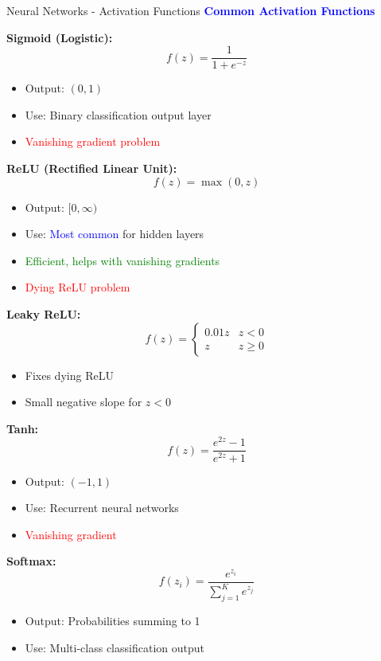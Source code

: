\documentclass[8pt]{beamer}
\begin{document}
	\begin{frame}{Neural Networks - Activation Functions}
		\fontsize{6.5}{7.5}\selectfont
		\textcolor{blue}{\textbf{Common Activation Functions}}
		
		\textbf{Sigmoid (Logistic):}
		\[
		f(z) = \frac{1}{1 + e^{-z}}
		\]
		\begin{itemize}
			\item Output: $(0, 1)$
			\item Use: Binary classification output layer
			\item \textcolor{red}{Vanishing gradient problem}
		\end{itemize}
		
		\textbf{ReLU (Rectified Linear Unit):}
		\[
		f(z) = \max(0, z)
		\]
		\begin{itemize}
			\item Output: $[0, \infty)$
			\item Use: \textcolor{blue}{Most common} for hidden layers
			\item \textcolor{green}{Efficient, helps with vanishing gradients}
			\item \textcolor{red}{Dying ReLU problem}
		\end{itemize}
		
		\textbf{Leaky ReLU:}
		\[
		f(z) = \begin{cases} 0.01z & z < 0 \\ z & z \geq 0 \end{cases}
		\]
		\begin{itemize}
			\item Fixes dying ReLU
			\item Small negative slope for $z < 0$
		\end{itemize}
		
		\textbf{Tanh:}
		\[
		f(z) = \frac{e^{2z} - 1}{e^{2z} + 1}
		\]
		\begin{itemize}
			\item Output: $(-1, 1)$
			\item Use: Recurrent neural networks
			\item \textcolor{red}{Vanishing gradient}
		\end{itemize}
		
		\textbf{Softmax:}
		\[
		f(z_i) = \frac{e^{z_i}}{\sum_{j=1}^K e^{z_j}}
		\]
		\begin{itemize}
			\item Output: Probabilities summing to 1
			\item Use: Multi-class classification output
		\end{itemize}
	\end{frame}
	
\end{document}
